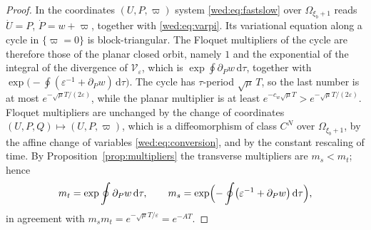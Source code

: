 \begin{proof}
In the coordinates $(U,P,\varpi)$ system \eqref{wed:eq:fastslow} over $\Omega_{\xi_b+1}$ reads $\dot U=P$, $\dot P=w+\varpi$, together with \eqref{wed:eq:varpi}. Its variational equation along a cycle in $\{\varpi=0\}$ is block-triangular. The Floquet multipliers of the cycle are therefore those of the planar closed orbit, namely $1$ and the exponential of the integral of the divergence of $\mathcal V_\varepsilon$, which is $\exp\oint\partial_Pw\,\mathrm d\tau$, together with $\exp\bigl(-\oint(\varepsilon^{-1}+\partial_Pw)\,\mathrm d\tau\bigr)$. The cycle has $\tau$-period $\sqrt\mu\,T$, so the last number is at most $e^{-\sqrt\mu T/(2\varepsilon)}$, while the planar multiplier is at least $e^{-c_w\sqrt\mu T}>e^{-\sqrt\mu T/(2\varepsilon)}$. Floquet multipliers are unchanged by the change of coordinates $(U,P,Q)\mapsto(U,P,\varpi)$, which is a diffeomorphism of class $C^N$ over $\Omega_{\xi_b+1}$, by the affine change of variables \eqref{wed:eq:conversion}, and by the constant rescaling of time. By Proposition~\ref{prop:multipliers} the transverse multipliers are $m_s<m_t$; hence
\begin{equation}\label{wed:eq:mtdivergence}
m_t=\exp\oint\partial_Pw\,\mathrm d\tau,\qquad m_s=\exp\Bigl(-\oint\bigl(\varepsilon^{-1}+\partial_Pw\bigr)\,\mathrm d\tau\Bigr),
\end{equation}
in agreement with $m_sm_t=e^{-\sqrt\mu T/\varepsilon}=e^{-AT}$.


\end{proof}
